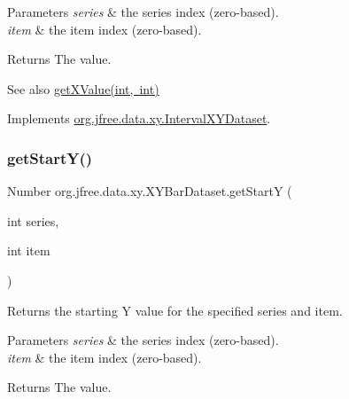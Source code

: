 \begin{DoxyParams}{Parameters}
{\em series} & the series index (zero-\/based). \\
\hline
{\em item} & the item index (zero-\/based).\\
\hline
\end{DoxyParams}
\begin{DoxyReturn}{Returns}
The value.
\end{DoxyReturn}
\begin{DoxySeeAlso}{See also}
\mbox{\hyperlink{classorg_1_1jfree_1_1data_1_1xy_1_1_x_y_bar_dataset_a84dba23fe8e4a19faff04e32a4bc0ea3}{get\+X\+Value(int, int)}} 
\end{DoxySeeAlso}


Implements \mbox{\hyperlink{interfaceorg_1_1jfree_1_1data_1_1xy_1_1_interval_x_y_dataset_a437afe7f637a8d16ad305023a7819eef}{org.\+jfree.\+data.\+xy.\+Interval\+X\+Y\+Dataset}}.

\mbox{\label{classorg_1_1jfree_1_1data_1_1xy_1_1_x_y_bar_dataset_a73d9f2c262f9bc9025b4325873394a09}} 
\subsubsection{\texorpdfstring{get\+Start\+Y()}{getStartY()}}
{\footnotesize\ttfamily Number org.\+jfree.\+data.\+xy.\+X\+Y\+Bar\+Dataset.\+get\+StartY (\begin{DoxyParamCaption}\item[{int}]{series,  }\item[{int}]{item }\end{DoxyParamCaption})}

Returns the starting Y value for the specified series and item.


\begin{DoxyParams}{Parameters}
{\em series} & the series index (zero-\/based). \\
\hline
{\em item} & the item index (zero-\/based).\\
\hline
\end{DoxyParams}
\begin{DoxyReturn}{Returns}
The value. 
\end{DoxyReturn}



